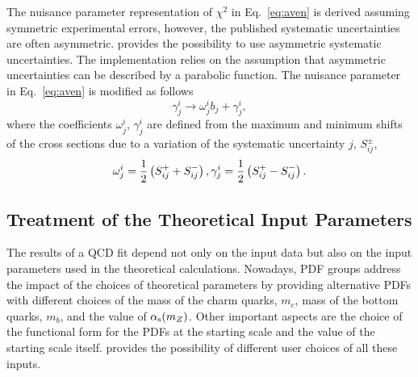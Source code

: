 %
The nuisance parameter representation of $\chi^2$ in Eq.~\ref{eq:aven} is derived assuming 
symmetric experimental errors, however, the published systematic uncertainties are 
often asymmetric.
\fitter provides the possibility to use asymmetric systematic uncertainties.
The implementation relies on the assumption that 
asymmetric uncertainties can be described by a parabolic function.
The nuisance parameter in Eq.~\ref{eq:aven} is modified as follows
\begin{equation}
  \gamma^i_{j} \to \omega^i_{j}b_j + \gamma^i_{j},
\end{equation}
where the coefficients $\omega^i_{j}$, $\gamma^i_{j}$ are defined  
from the maximum and minimum shifts of the cross sections due to a  variation of the systematic uncertainty $j$, 
$S_{ij}^{\pm}$,
\begin{equation}
  \omega^i_{j}=\frac{1}{2}\left(S_{ij}^{+}+S_{ij}^{-}\right), \\
  \gamma^i_{j}=\frac{1}{2}\left(S_{ij}^{+}-S_{ij}^{-}\right). 
\end{equation}





\subsection{Treatment of the Theoretical Input Parameters}
\label{sec:theoryerr}

The results of a QCD fit depend not only on the input data but also on the 
input parameters used in the theoretical calculations. Nowadays, PDF groups 
address the impact of the choices of theoretical parameters by providing
alternative PDFs with different choices of the mass of the charm quarks, $m_c$, 
mass of the bottom quarks, $m_b$, and the value of $\alpha_\mathrm{s}(m_Z)$. 
Other important aspects are the choice of the functional form for the PDFs at the 
starting scale and the value of the starting scale itself. \fitter provides the
possibility of different user choices of all these inputs.%

